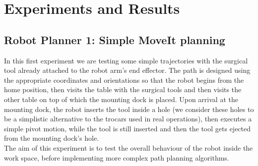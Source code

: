 \chapter{Experiments and Results}

\section{Robot Planner 1: Simple MoveIt planning}

In this first experiment we are testing some simple trajectories with the surgical tool already attached to the robot arm's end effector.
The path is designed using the appropriate coordinates and orientations so that the robot begins from the home position, then visits the table with the surgical 
tools and then visits the other table on top of which the mounting dock is placed. Upon arrival at the mounting dock, the robot inserts the tool inside a hole
(we consider these holes to be a simplistic alternative to the trocars used in real operations), then executes a simple pivot motion, while the tool is still 
inserted and then the tool gets ejected from the mounting dock's hole.\\

The aim of this experiment is to test the overall behaviour of the robot inside the work space, before implementing more complex path planning algorithms.

